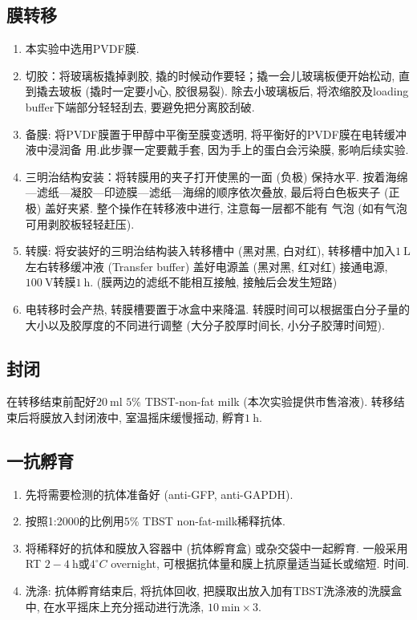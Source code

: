 \documentclass{article}
\begin{document}
\subsection{膜转移}

\begin{enumerate}
    \item 本实验中选用PVDF膜.
    \item 切胶：将玻璃板撬掉剥胶, 撬的时候动作要轻；撬一会儿玻璃板便开始松动, 直到撬去玻板 (撬时一定要小心, 胶很易裂). 除去小玻璃板后, 将浓缩胶及loading buffer下端部分轻轻刮去, 要避免把分离胶刮破. 
    \item 备膜: 将PVDF膜置于甲醇中平衡至膜变透明, 将平衡好的PVDF膜在电转缓冲液中浸润备 用.此步骤一定要戴手套, 因为手上的蛋白会污染膜, 影响后续实验.
    \item 三明治结构安装：将转膜用的夹子打开使黑的一面 (负极) 保持水平. 按着海绵---滤纸---凝胶---印迹膜---滤纸---海绵的顺序依次叠放, 最后将白色板夹子 (正极) 盖好夹紧. 整个操作在转移液中进行, 注意每一层都不能有
    气泡 (如有气泡可用剥胶板轻轻赶压).
    \item 转膜: 将安装好的三明治结构装入转移槽中 (黑对黑, 白对红), 转移槽中加入$1\ \mbox{L}$左右转移缓冲液 (Transfer buffer) 盖好电源盖 (黑对黑, 红对红) 接通电源, $100\ \mbox{V}$转膜$1\ \mbox{h}$. (膜两边的滤纸不能相互接触, 接触后会发生短路)
    \item 电转移时会产热, 转膜槽要置于冰盒中来降温. 转膜时间可以根据蛋白分子量的大小以及胶厚度的不同进行调整 (大分子胶厚时间长, 小分子胶薄时间短).
\end{enumerate}

\subsection{封闭}

在转移结束前配好$20\ \mbox{ml}$ $5\%$ TBST-non-fat milk (本次实验提供市售溶液). 转移结束后将膜放入封闭液中, 室温摇床缓慢摇动, 孵育$1\ \mbox{h}$.

\subsection{一抗孵育}

\begin{enumerate}
    \item 先将需要检测的抗体准备好 (anti-GFP, anti-GAPDH).
    \item 按照1:2000的比例用$5\%$ TBST non-fat-milk稀释抗体.
    \item 将稀释好的抗体和膜放入容器中 (抗体孵育盒) 或杂交袋中一起孵育. 一般采用RT $2-4\ \mbox{h}$或$4^\circ C$ overnight, 可根据抗体量和膜上抗原量适当延长或缩短.
    时间.
    \item  洗涤: 抗体孵育结束后, 将抗体回收, 把膜取出放入加有TBST洗涤液的洗膜盒中, 在水平摇床上充分摇动进行洗涤, $10\ \mbox{min} \times 3$. 
\end{enumerate}
\end{document}
